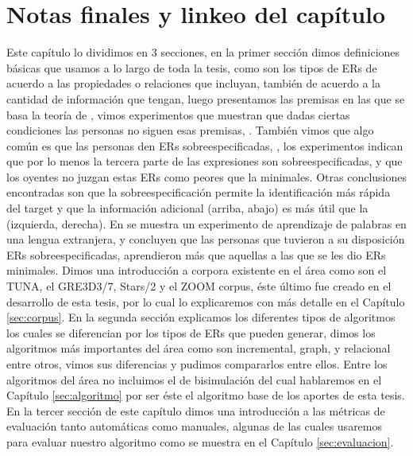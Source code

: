 \section{Notas finales y linkeo del cap\'itulo}
\label{sec:linkeo2}

Este cap\'itulo lo dividimos en 3 secciones, en la primer secci\'on dimos definiciones b\'asicas que usamos a lo largo de toda la tesis, 
como son los tipos de ERs de acuerdo a las propiedades o relaciones que incluyan, tambi\'en de acuerdo a la cantidad de informaci\'on que 
tengan, luego presentamos las premisas en las que se basa la teor\'ia de \cite{clark1992arenas,clark96,Clark-Marshall81}, vimos experimentos que muestran que dadas ciertas condiciones las personas no siguen esas premisas, 
\cite{keysar:Curr98}. Tambi\'en vimos que algo com\'un es que las personas den ERs sobreespecificadas, \cite{arts,Engelhardt_Bailey_Ferreira_2006}, los experimentos 
indican que por lo menos la tercera parte de las expresiones son sobreespecificadas, y que los oyentes no juzgan estas ERs como peores que 
la minimales. Otras conclusiones encontradas son que la sobreespecificaci\'on permite la identificaci\'on m\'as r\'apida del target y que la 
informaci\'on adicional (arriba, abajo) es m\'as \'util que la (izquierda, derecha). En \cite{Lu_sasha2015} se muestra un experimento de 
aprendizaje de palabras en una lengua extranjera, y concluyen que las personas que tuvieron a su disposici\'on ERs sobreespecificadas, 
aprendieron m\'as que aquellas a las que se les dio ERs minimales. Dimos una introducci\'on a corpora existente en el \'area 
como son el TUNA, el GRE3D3/7, Stars/2 y el ZOOM corpus, \'este \'ultimo fue creado en el desarrollo de esta tesis, por lo cual lo explicaremos con m\'as detalle en el Cap\'itulo \ref{sec:corpus}. En la segunda secci\'on explicamos los diferentes tipos de algoritmos los cuales se 
diferencian por los tipos de ERs que pueden generar, dimos los algoritmos m\'as importantes del \'area como son incremental, graph, y relacional entre otros, vimos sus diferencias y pudimos compararlos entre ellos. Entre los algoritmos del \'area no incluimos el de 
bisimulaci\'on del cual hablaremos en el Cap\'itulo \ref{sec:algoritmo} por ser \'este el algoritmo base de los aportes de esta tesis. En la tercer secci\'on de este cap\'itulo dimos una introducci\'on a las m\'etricas de evaluaci\'on tanto autom\'aticas como manuales, algunas de las cuales usaremos para evaluar nuestro algoritmo como se muestra en el Cap\'itulo \ref{sec:evaluacion}.

